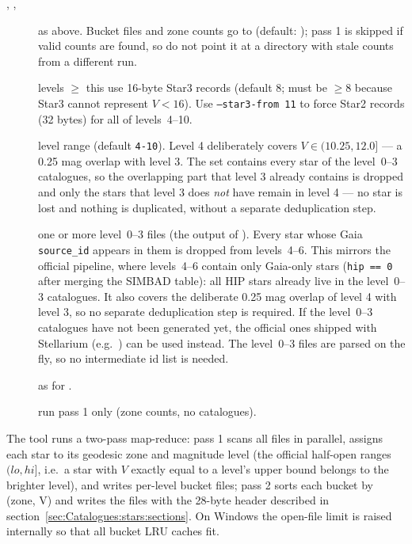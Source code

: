 \begin{description}
  \item[, , ]
        as above. Bucket files and zone counts go to 
        (default: ); pass 1 is skipped if valid counts
        are found, so do not point it at a directory with stale counts from
        a different run.
  \item[] levels $\ge$ this use 16-byte Star3 records
        (default 8; must be $\ge 8$ because Star3 cannot represent $V<16$).
        Use \texttt{--star3-from 11} to force Star2 records (32 bytes) for
        all of levels~4--10.
  \item[] level range (default \texttt{4-10}).
        Level 4 deliberately covers $V \in (10.25, 12.0]$ --- a 0.25 mag
        overlap with level 3. The  set contains
        every star of the level~0--3 catalogues, so the overlapping part
        that level 3 already contains is dropped and only the stars that
        level 3 does \emph{not} have remain in level 4 --- no star is
        lost and nothing is duplicated, without a separate deduplication
        step.
  \item[] one or more level~0--3  files
        (the output of ). Every star whose Gaia
        \texttt{source\_id} appears in them is dropped from levels~4--6.
        This mirrors the official pipeline, where levels~4--6 contain only
        Gaia-only stars (\texttt{hip == 0} after merging the SIMBAD table):
        all HIP stars already live in the level~0--3 catalogues. It also
        covers the deliberate 0.25 mag overlap of level 4 with level 3, so
        no separate deduplication step is required. If the level~0--3
        catalogues have not been generated yet, the official ones shipped
        with Stellarium (e.g.\ )
        can be used instead. The level~0--3 files are parsed on the fly, so
        no intermediate id list is needed.
  \item[] as for .
  \item[] run pass 1 only (zone counts, no catalogues).
\end{description}

The tool runs a two-pass map-reduce: pass 1 scans all  files in
parallel, assigns each star to its geodesic zone and magnitude level (the
official half-open ranges $(lo, hi]$, i.e.\ a star with $V$ exactly equal
to a level's upper bound belongs to the brighter level), and writes
per-level bucket files; pass 2 sorts each bucket by (zone, V) and writes
the  files with the 28-byte header described in
section~\ref{sec:Catalogues:stars:sections}. On Windows the open-file limit
is raised internally so that all bucket LRU caches fit.

